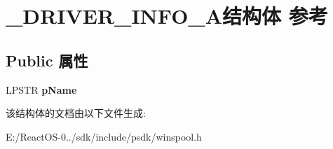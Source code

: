 \hypertarget{struct___d_r_i_v_e_r___i_n_f_o__1_a}{}\section{\+\_\+\+D\+R\+I\+V\+E\+R\+\_\+\+I\+N\+F\+O\+\_\+A结构体 参考}
\label{struct___d_r_i_v_e_r___i_n_f_o__1_a}
\subsection*{Public 属性}
\begin{DoxyCompactItemize}
\item 
\mbox{\label{struct___d_r_i_v_e_r___i_n_f_o__1_a_abdd92aff6d7c30279af9f475f7c42784}} 
L\+P\+S\+TR {\bfseries p\+Name}
\end{DoxyCompactItemize}


该结构体的文档由以下文件生成\+:\begin{DoxyCompactItemize}
\item 
E\+:/\+React\+O\+S-\/0../sdk/include/psdk/winspool.\+h\end{DoxyCompactItemize}
